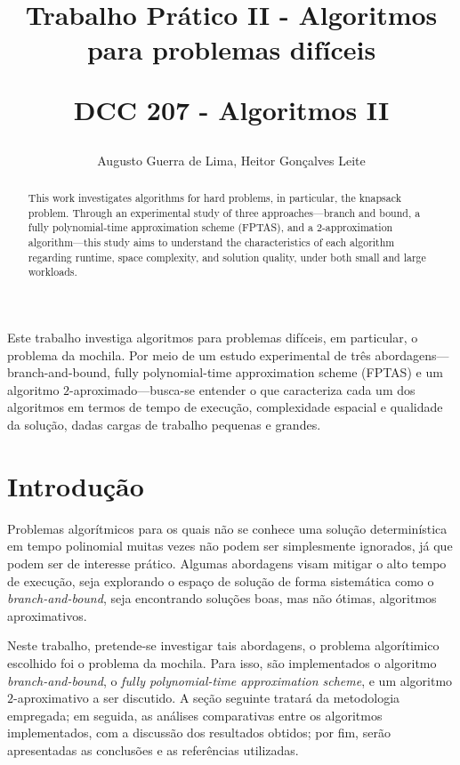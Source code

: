 \documentclass[12pt]{article}
\title{Trabalho Prático II - Algoritmos para problemas difíceis 

DCC 207 - Algoritmos II}
\author{Augusto Guerra de Lima, Heitor Gonçalves Leite}
\begin{document}
 

\maketitle

\begin{abstract}
This work investigates algorithms for hard problems, in particular, the knapsack problem. Through an experimental study of three approaches—branch and bound, a fully polynomial-time approximation scheme (FPTAS), and a \(2\)-approximation algorithm—this study aims to understand the characteristics of each algorithm regarding runtime, space complexity, and solution quality, under both small and large workloads.
\end{abstract}
     
\begin{resumo} 
Este trabalho investiga algoritmos para problemas difíceis, em particular, o problema da mochila. Por meio de um estudo experimental de três abordagens—branch-and-bound, fully polynomial-time approximation scheme (FPTAS) e um algoritmo \(2\)-aproximado—busca-se entender o que caracteriza cada um dos algoritmos em termos de tempo de execução, complexidade espacial e qualidade da solução, dadas cargas de trabalho pequenas e grandes.
\end{resumo}


\section{Introdução}

Problemas algorítmicos para os quais não se conhece uma solução determinística em tempo polinomial muitas vezes não podem ser simplesmente ignorados, já que podem ser de interesse prático. Algumas abordagens visam mitigar o alto tempo de execução, seja explorando o espaço de solução de forma sistemática como o \textit{branch-and-bound}, seja encontrando soluções boas, mas não ótimas, algoritmos aproximativos.

Neste trabalho, pretende-se investigar tais abordagens, o problema algorítimico escolhido foi o problema da mochila. Para isso, são implementados o algoritmo \textit{branch-and-bound}, o \textit{fully polynomial-time approximation scheme}, e um algoritmo \(2\)-aproximativo a ser discutido. A seção seguinte tratará da metodologia empregada; em seguida, as análises comparativas entre os algoritmos implementados, com a discussão dos resultados obtidos; por fim, serão apresentadas as conclusões e as referências utilizadas.
\end{document}
